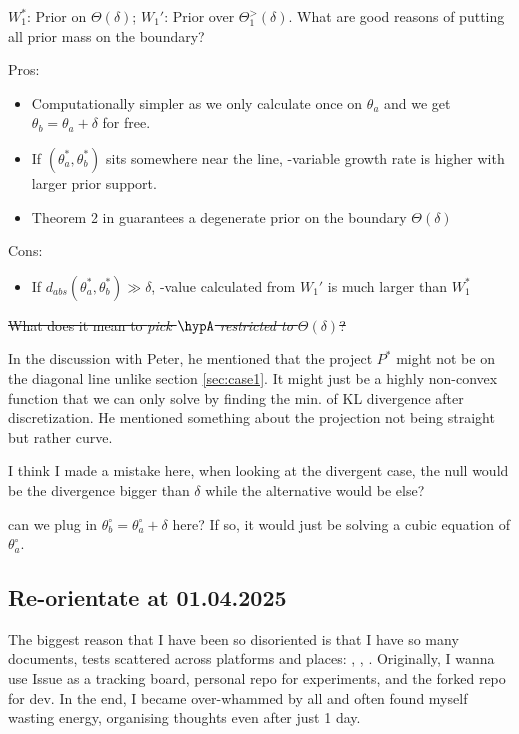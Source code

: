 $W_1^*$: Prior on $\Theta(\delta)$; $W_1'$: Prior over $\Theta_1^>(\delta)$.
What are good reasons of putting all prior mass on the boundary?

Pros:
\begin{itemize}
	\item Computationally simpler as we only calculate once on $\theta_a$
	      and we get $\theta_b = \theta_a + \delta$ for free.
	\item If $(\theta_a^*, \theta_b^*)$ sits somewhere near the line,
	      \E-variable growth rate is higher with larger prior support.
	\item Theorem 2 in \cite{turnerExactAnytimevalidConfidence2023} guarantees a degenerate prior
	      on the boundary $\Theta(\delta)$
\end{itemize}

Cons:
\begin{itemize}
	\item If $d_{abs}(\theta_a^*, \theta_b^*) \gg \delta $,
	      \E-value calculated from $W_1'$ is much larger than $W_1^*$
\end{itemize}

\sout{What does it mean to \emph{pick $\hypA$ restricted to $\Theta(\delta)$}?}

In the discussion with Peter, he mentioned that the project $P^*$ might not be on the diagonal line unlike section \ref{sec:case1}.
It might just be a highly non-convex function that we can only solve by finding the min. of KL divergence after discretization.
He mentioned something about the projection not being straight but rather curve.

I think I made a mistake here, when looking at the divergent case,
the null would be the divergence bigger than $\delta$ while the alternative would be else?

{\color{red}
	can we plug in $\theta_b^\circ = \theta_a^\circ + \delta$ here? If so,
	it would just be solving a cubic equation of $\theta_a^\circ$.
}


\subsection{Re-orientate at 01.04.2025}

The biggest reason that I have been so disoriented is that I have so many documents, tests
scattered across platforms and places: \githubIssue, \personalRepo, \forkedRepo.
Originally, I wanna use Issue as a tracking board, personal repo for experiments,
and the forked repo for dev.
In the end, I became over-whammed by all and often found myself wasting energy,
organising thoughts even after just 1 day.

